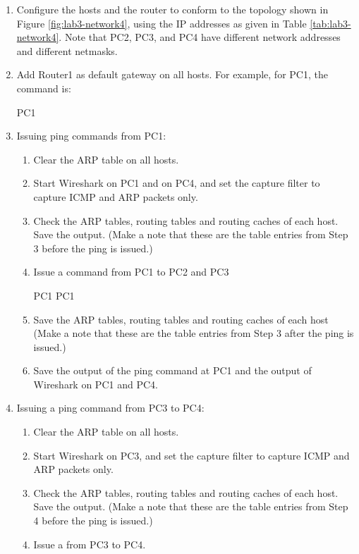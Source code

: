 \begin{enumerate}
	\item Configure the hosts and the router to conform to the topology shown in Figure \ref{fig:lab3-network4}, using the IP addresses as given in Table \ref{tab:lab3-network4}.
		Note that PC2, PC3, and PC4 have different network addresses and different netmasks.
	\item Add Router1 as default gateway on all hosts. For example, for PC1, the command is:
		\begin{cmdblock}
	PC1%
		\end{cmdblock}
	\item Issuing ping commands from PC1:
		\begin{enumerate}[label=\alph*.,leftmargin=3em]
			\item Clear the ARP table on all hosts.
			\item Start Wireshark on PC1 and on PC4, and set the capture filter to capture ICMP and ARP packets only.
			\item Check the ARP tables, routing tables and routing caches of each host. Save the output. (Make a note that these are the table entries from Step 3 before the ping is issued.)
			\item Issue a  command from PC1 to PC2 and PC3 
				\begin{cmdblock}
	PC1%
	PC1%
				\end{cmdblock}
			\item Save the ARP tables, routing tables and routing caches of each host (Make a note that these are the table entries from Step 3 after the ping is issued.)
			\item Save the output of the ping command at PC1 and the output of Wireshark on PC1 and PC4.
		\end{enumerate}
	\item Issuing a ping command from PC3 to PC4:
		\begin{enumerate}[label=\alph*.,leftmargin=3em]
			\item Clear the ARP table on all hosts.
			\item Start Wireshark on PC3, and set the capture filter to capture ICMP and ARP packets only.
			\item Check the ARP tables, routing tables and routing caches of each host. Save the output. (Make a note that these are the table entries from Step 4 before the ping is issued.)
			\item Issue a  from PC3 to PC4. 

\end{enumerate}
\end{enumerate}
